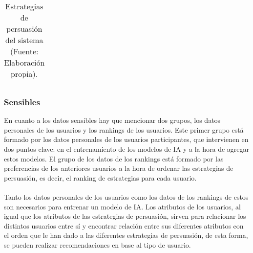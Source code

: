 \begin{table}[H]
\begin{center}
\begin{tabular}{|c|p{0.45\linewidth}|p{0.2\linewidth}|p{0.2\linewidth}|}
        \end{tabular}
        \caption{\centering Estrategias de persuasión del sistema (Fuente: Elaboración propia).}
        \label{tab:EstrategiasPersuasion}
    \end{center}    
\end{table}


\subsubsection{Sensibles}
En cuanto a los datos sensibles hay que mencionar dos grupos, los datos personales de los usuarios y los rankings de los usuarios. Este primer grupo está formado por los datos personales de los usuarios participantes, que intervienen en dos puntos clave: en el entrenamiento de los modelos de IA y a la hora de agregar estos modelos. El grupo de los datos de los rankings está formado por las preferencias de los anteriores usuarios a la hora de ordenar las estrategias de persuasión, es decir, el ranking de estrategias para cada usuario.
\\ \\
Tanto los datos personales de los usuarios como los datos de los rankings de estos son necesarios para entrenar un modelo de IA. Los atributos de los usuarios, al igual que los atributos de las estrategias de persuasión, sirven para relacionar los distintos usuarios entre sí y encontrar relación entre sus diferentes atributos con el orden que le han dado a las diferentes estrategias de persuasión, de esta forma, se pueden realizar recomendaciones en base al tipo de usuario.

